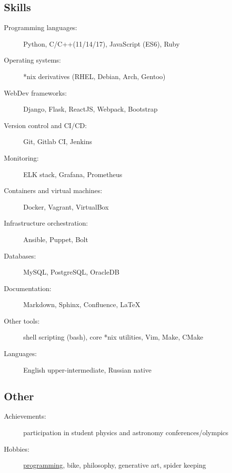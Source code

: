 \documentclass[12pt]{report}
\begin{document}
\subsection*{Skills}
\begin{description}
    \item[Programming languages:]
    Python, C/C++(11/14/17), JavaScript (ES6), Ruby
    \item[Operating systems:]
    *nix derivatives (RHEL, Debian, Arch, Gentoo)
    \item[WebDev frameworks:]
    Django, Flask, ReactJS, Webpack, Bootstrap
    \item[Version control and CI/CD:]
    Git, Gitlab CI, Jenkins
    \item[Monitoring:]
    ELK stack, Grafana, Prometheus
    \item[Containers and virtual machines:]
    Docker, Vagrant, VirtualBox
    \item[Infrastructure orchestration:]
    Ansible, Puppet, Bolt
    \item[Databases:]
    MySQL, PostgreSQL, OracleDB
    \item[Documentation:]
    Markdown, Sphinx, Confluence, LaTeX
    \item[Other tools:]
    shell scripting (bash), core *nix utilities, Vim, Make, CMake
    \item[Languages:]
    English upper-intermediate, Russian native
\end{description}

\subsection*{Other}
\begin{description}
    \item[Achievements:]
    participation in student physics and astronomy conferences/olympics
    \item[Hobbies:]
    \href{https://github.com/unsip}{programming}, bike, philosophy, generative art, spider keeping
\end{description}
\end{document}
